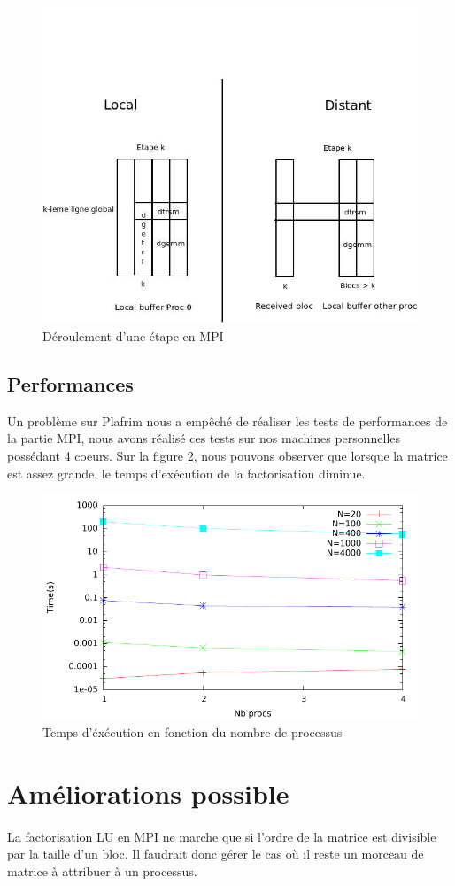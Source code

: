 \documentclass{article}
\begin{document}
\begin{figure}[ht]
  \centering
  \includegraphics[scale=0.5]{pictures/Diagramme_mpi.jpeg}
  \caption{\label{diag:mpi} Déroulement d'une étape en MPI}
\end{figure}

\subsection{Performances}
Un problème sur Plafrim nous a empêché de réaliser les tests de performances de la partie MPI, nous avons réalisé ces tests sur nos machines personnelles possédant 4 coeurs. Sur la figure \ref{fig:mpi}, nous pouvons observer que lorsque la matrice est assez grande, le temps d'exécution de la factorisation diminue.

\newpage
\begin{figure}[ht]
  \centering
  \includegraphics[scale=0.7]{curves/data/mpi.pdf}
  \caption{\label{fig:mpi} Temps d'éxécution en fonction du nombre de processus}
\end{figure}


\section{Améliorations possible}

\paragraph{}La factorisation LU en MPI ne marche que si l'ordre de la matrice est divisible par la taille d'un bloc. Il faudrait donc gérer le cas où il reste un morceau de matrice à attribuer à un processus.
\end{document}
